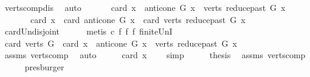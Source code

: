 \begin{isabellebody}
\ verts{\isacharunderscore}{\kern0pt}comp{\isacharunderscore}{\kern0pt}dis\ \isamarkupfalse%
\ auto\isanewline
\ \ \isamarkupfalse%
\ \isamarkupfalse%
\ {\isachardoublequoteopen}\ card\ {\isacharparenleft}{\kern0pt}{\isacharbraceleft}{\kern0pt}x{\isacharbraceright}{\kern0pt}\ {\isasymunion}\ {\isacharparenleft}{\kern0pt}anticone\ G\ x{\isacharparenright}{\kern0pt}\ {\isasymunion}\ verts\ {\isacharparenleft}{\kern0pt}reduce{\isacharunderscore}{\kern0pt}past\ G\ x{\isacharparenright}{\kern0pt}{\isacharparenright}{\kern0pt}\ \isanewline
\ \ \ \ \ \ {\isacharequal}{\kern0pt}\ card\ {\isacharbraceleft}{\kern0pt}x{\isacharbraceright}{\kern0pt}\ {\isacharplus}{\kern0pt}\ card\ {\isacharparenleft}{\kern0pt}anticone\ G\ x{\isacharparenright}{\kern0pt}\ {\isacharplus}{\kern0pt}\ card\ {\isacharparenleft}{\kern0pt}verts\ {\isacharparenleft}{\kern0pt}reduce{\isacharunderscore}{\kern0pt}past\ G\ x{\isacharparenright}{\kern0pt}{\isacharparenright}{\kern0pt}\isanewline
\ \ \ \ \ \ \ \ {\isachardoublequoteclose}\ \isamarkupfalse%
\ card{\isacharunderscore}{\kern0pt}Un{\isacharunderscore}{\kern0pt}disjoint\isanewline
\ \ \ \ \isamarkupfalse%
\ {\isacharparenleft}{\kern0pt}metis\ c{}\ f{}\ f{}\ f{}\ finite{\isacharunderscore}{\kern0pt}UnI{\isacharparenright}{\kern0pt}\ \isanewline
\ \ \isamarkupfalse%
\ \isamarkupfalse%
\ {\isachardoublequoteopen}card\ {\isacharparenleft}{\kern0pt}verts\ G{\isacharparenright}{\kern0pt}\ {\isacharequal}{\kern0pt}\ card\ {\isacharparenleft}{\kern0pt}{\isacharbraceleft}{\kern0pt}x{\isacharbraceright}{\kern0pt}\ {\isasymunion}\ {\isacharparenleft}{\kern0pt}anticone\ G\ x{\isacharparenright}{\kern0pt}\ {\isasymunion}\ verts\ {\isacharparenleft}{\kern0pt}reduce{\isacharunderscore}{\kern0pt}past\ G\ x{\isacharparenright}{\kern0pt}{\isacharparenright}{\kern0pt}{\isachardoublequoteclose}\isanewline
\ \ \ \ \isamarkupfalse%
\ assms\ verts{\isacharunderscore}{\kern0pt}comp\ \isamarkupfalse%
\ auto\isanewline
\ \ \isamarkupfalse%
\ \isamarkupfalse%
\ {\isachardoublequoteopen}card\ {\isacharbraceleft}{\kern0pt}x{\isacharbraceright}{\kern0pt}\ {\isacharequal}{\kern0pt}\ {}{\isachardoublequoteclose}\ \isamarkupfalse%
\ simp\isanewline
\ \ \isamarkupfalse%
\ \isamarkupfalse%
\ {\isacharquery}{\kern0pt}thesis\ \isamarkupfalse%
\ assms\ verts{\isacharunderscore}{\kern0pt}comp\isanewline
\ \ \ \ \isamarkupfalse%
\ presburger\ \ \isanewline
{}\isamarkupfalse%
%
\endisatagproof
{\isafoldproof}%
%
\isadelimproof
\isanewline
%
\endisadelimproof
%
\isadelimtheory
\isanewline
%
\endisadelimtheory
%
\isatagtheory
{}\isamarkupfalse%
%
\endisatagtheory
{\isafoldtheory}%
%
\isadelimtheory
%
\endisadelimtheory
%
\end{isabellebody}%
